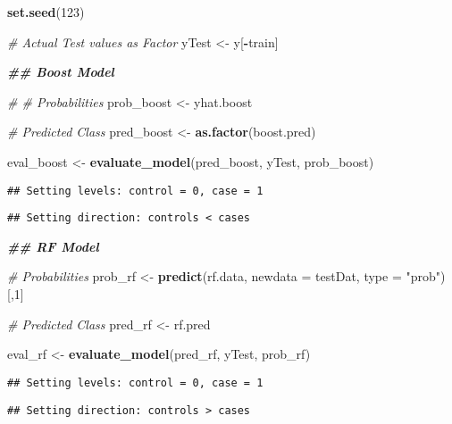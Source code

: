 \documentclass[
]{article}
\newenvironment{Shaded}{\begin{snugshade}}{\end{snugshade}}
\newcommand{\AttributeTok}[1]{\textcolor[rgb]{0.13,0.29,0.53}{#1}}
\newcommand{\CommentTok}[1]{\textcolor[rgb]{0.56,0.35,0.01}{\textit{#1}}}
\newcommand{\DecValTok}[1]{\textcolor[rgb]{0.00,0.00,0.81}{#1}}
\newcommand{\DocumentationTok}[1]{\textcolor[rgb]{0.56,0.35,0.01}{\textbf{\textit{#1}}}}
\newcommand{\FunctionTok}[1]{\textcolor[rgb]{0.13,0.29,0.53}{\textbf{#1}}}
\newcommand{\NormalTok}[1]{#1}
\newcommand{\OtherTok}[1]{\textcolor[rgb]{0.56,0.35,0.01}{#1}}
\newcommand{\SpecialCharTok}[1]{\textcolor[rgb]{0.81,0.36,0.00}{\textbf{#1}}}
\newcommand{\StringTok}[1]{\textcolor[rgb]{0.31,0.60,0.02}{#1}}
\begin{document}
\begin{Shaded}
\begin{Highlighting}[]
\FunctionTok{set.seed}\NormalTok{(}\DecValTok{123}\NormalTok{)}


\CommentTok{\# Actual Test values as Factor}
\NormalTok{yTest }\OtherTok{\textless{}{-}}\NormalTok{ y[}\SpecialCharTok{{-}}\NormalTok{train]}


\DocumentationTok{\#\# Boost Model}

\CommentTok{\# \# Probabilities}
\NormalTok{prob\_boost }\OtherTok{\textless{}{-}}\NormalTok{ yhat.boost}

\CommentTok{\# Predicted Class}
\NormalTok{pred\_boost }\OtherTok{\textless{}{-}} \FunctionTok{as.factor}\NormalTok{(boost.pred)}


\NormalTok{eval\_boost }\OtherTok{\textless{}{-}} \FunctionTok{evaluate\_model}\NormalTok{(pred\_boost, yTest, prob\_boost)}
\end{Highlighting}
\end{Shaded}

\begin{verbatim}
## Setting levels: control = 0, case = 1
\end{verbatim}

\begin{verbatim}
## Setting direction: controls < cases
\end{verbatim}

\begin{Shaded}
\begin{Highlighting}[]
\DocumentationTok{\#\# RF Model}

\CommentTok{\# Probabilities}
\NormalTok{prob\_rf }\OtherTok{\textless{}{-}} \FunctionTok{predict}\NormalTok{(rf.data, }\AttributeTok{newdata =}\NormalTok{ testDat, }\AttributeTok{type =} \StringTok{"prob"}\NormalTok{)[,}\DecValTok{1}\NormalTok{]}

\CommentTok{\# Predicted Class}
\NormalTok{pred\_rf }\OtherTok{\textless{}{-}}\NormalTok{ rf.pred}

\NormalTok{eval\_rf }\OtherTok{\textless{}{-}} \FunctionTok{evaluate\_model}\NormalTok{(pred\_rf, yTest, prob\_rf)}
\end{Highlighting}
\end{Shaded}

\begin{verbatim}
## Setting levels: control = 0, case = 1
\end{verbatim}

\begin{verbatim}
## Setting direction: controls > cases
\end{verbatim}
\end{document}
